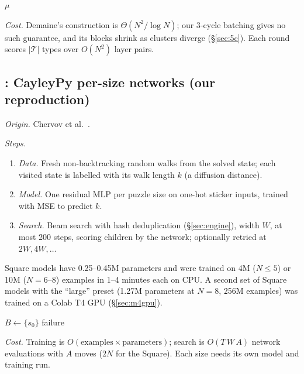 \begin{algorithm}[t]
\caption{\Mthree: one family of cube clusters (our reproduction with 3-cycle batching)}
\label{alg:m3}
\small
{}
\Return $\mu$\;
\end{algorithm}

\emph{Cost.} Demaine's construction is $\Theta(N^2/\log N)$; our 3-cycle batching gives no such guarantee, and its blocks
shrink as clusters diverge (\S\ref{sec:5c}). Each round scores $|\mathcal{T}|$ types over $O(N^2)$ layer pairs.

\subsection{\Mfour: CayleyPy per-size networks (our reproduction)}
\label{sec:m4}

\emph{Origin.} Chervov et al.~\cite{chervov2025cayleypy}.

\emph{Steps.}
\begin{enumerate}
\item \emph{Data.} Fresh non-backtracking random walks from the solved state; each visited state is labelled with its
  walk length $k$ (a diffusion distance).
\item \emph{Model.} One residual MLP per puzzle size on one-hot sticker inputs, trained with MSE to predict $k$.
\item \emph{Search.} Beam search with hash deduplication (\S\ref{sec:engine}), width $W$, at most 200 steps, scoring
  children by the network; optionally retried at $2W, 4W, \dots$
\end{enumerate}
Square models have 0.25--0.45M parameters and were trained on 4M ($N\le5$) or 10M ($N=6$--8) examples in 1--4 minutes
each on CPU. A second set of Square models with the ``large'' preset (1.27M parameters at $N=8$, 256M examples) was trained
on a Colab T4 GPU (\S\ref{sec:m4gpu}).

\begin{algorithm}[t]
\caption{\Mfour: beam search with a learned distance (our reproduction of the CayleyPy project~\cite{chervov2025cayleypy})}
\label{alg:m4}
\small
{}
$B\leftarrow\{s_0\}$\;
\Return failure\;
\end{algorithm}

\emph{Cost.} Training is $O(\text{examples}\times\text{parameters})$; search is $O(T\,W\,A)$ network evaluations with $A$
moves ($2N$ for the Square). Each size needs its own model and training run.

